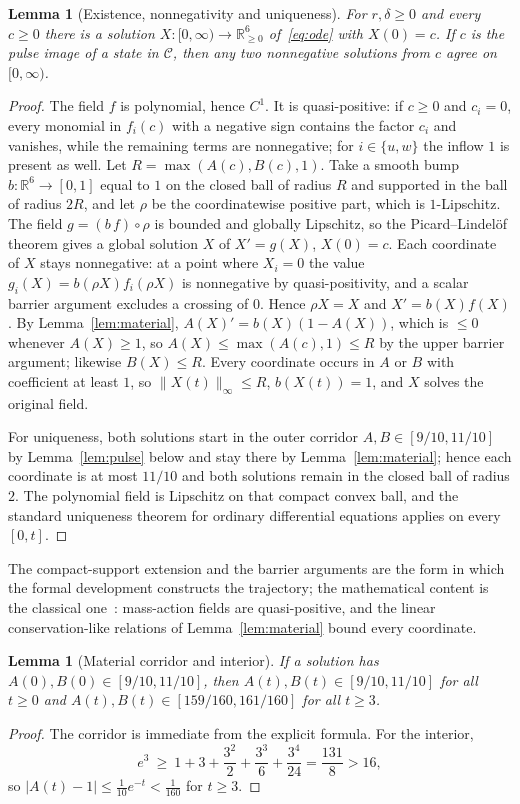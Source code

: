 \documentclass[11pt,a4paper]{article}
\theoremstyle{plain}
\newtheorem{lemma}[theorem]{Lemma}
\theoremstyle{definition}
\theoremstyle{remark}
\newcommand{\R}{\mathbb R}
\newcommand{\Adm}{\mathcal C}
\begin{document}
\begin{lemma}[Existence, nonnegativity and uniqueness]\label{lem:existence}
For $r,\delta\ge0$ and every $c\ge0$ there is a solution $X:[0,\infty)\to\R^6_{\ge0}$ of~\eqref{eq:ode} with $X(0)=c$. If $c$ is the pulse image of a state in $\Adm$, then any two nonnegative solutions from $c$ agree on $[0,\infty)$.
\end{lemma}
\begin{proof}
The field $f$ is polynomial, hence $C^1$. It is quasi-positive: if $c\ge0$ and $c_i=0$, every monomial in $f_i(c)$ with a negative sign contains the factor $c_i$ and vanishes, while the remaining terms are nonnegative; for $i\in\{u,w\}$ the inflow $1$ is present as well. Let $R=\max(A(c),B(c),1)$. Take a smooth bump $b:\R^6\to[0,1]$ equal to $1$ on the closed ball of radius $R$ and supported in the ball of radius $2R$, and let $\rho$ be the coordinatewise positive part, which is $1$-Lipschitz. The field $g=(b\,f)\circ\rho$ is bounded and globally Lipschitz, so the Picard--Lindel\"of theorem gives a global solution $X$ of $X'=g(X)$, $X(0)=c$. Each coordinate of $X$ stays nonnegative: at a point where $X_i=0$ the value $g_i(X)=b(\rho X)f_i(\rho X)$ is nonnegative by quasi-positivity, and a scalar barrier argument excludes a crossing of $0$. Hence $\rho X=X$ and $X'=b(X)f(X)$. By Lemma~\ref{lem:material}, $A(X)'=b(X)(1-A(X))$, which is $\le0$ whenever $A(X)\ge1$, so $A(X)\le\max(A(c),1)\le R$ by the upper barrier argument; likewise $B(X)\le R$. Every coordinate occurs in $A$ or $B$ with coefficient at least $1$, so $\|X(t)\|_\infty\le R$, $b(X(t))=1$, and $X$ solves the original field.

For uniqueness, both solutions start in the outer corridor $A,B\in[9/10,11/10]$ by Lemma~\ref{lem:pulse} below and stay there by Lemma~\ref{lem:material}; hence each coordinate is at most $11/10$ and both solutions remain in the closed ball of radius $2$. The polynomial field is Lipschitz on that compact convex ball, and the standard uniqueness theorem for ordinary differential equations applies on every $[0,t]$.
\end{proof}

The compact-support extension and the barrier arguments are the form in which the formal development constructs the trajectory; the mathematical content is the classical one~\citep{feinberg2019}: mass-action fields are quasi-positive, and the linear conservation-like relations of Lemma~\ref{lem:material} bound every coordinate.

\begin{lemma}[Material corridor and interior]\label{lem:corridor}
If a solution has $A(0),B(0)\in[9/10,11/10]$, then $A(t),B(t)\in[9/10,11/10]$ for all $t\ge0$ and $A(t),B(t)\in[159/160,161/160]$ for all $t\ge3$.
\end{lemma}
\begin{proof}
The corridor is immediate from the explicit formula. For the interior,
\[
e^3\ \ge\ 1+3+\frac{3^2}{2}+\frac{3^3}{6}+\frac{3^4}{24}=\frac{131}{8}>16,
\]
so $|A(t)-1|\le\tfrac1{10}e^{-t}<\tfrac1{160}$ for $t\ge3$.
\end{proof}
\end{document}
